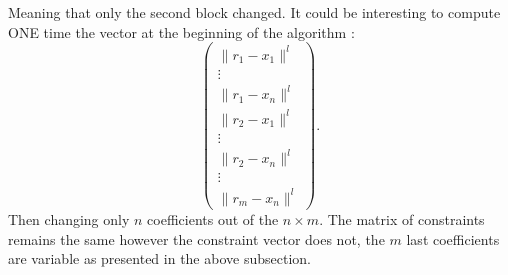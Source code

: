 \documentclass{amsart}
\begin{document}
Meaning that only the second block changed. It could be interesting to compute ONE time the vector at the beginning of the algorithm :
$$
\begin{pmatrix}
    \lVert r_1-x_1 \rVert^l \\ \vdots \\ \lVert r_1-x_n \rVert^l \\ \lVert r_2-x_1 \rVert^l\\  \vdots  \\  \lVert r_2-x_n \rVert^l \\ \vdots \\ \lVert r_m-x_n \rVert ^l
\end{pmatrix}.
$$
Then changing only $n$ coefficients out of the $n\times m$.
The matrix of constraints remains the same however the constraint vector does not, the $m$ last coefficients are variable as presented in the above subsection.
\end{document}

